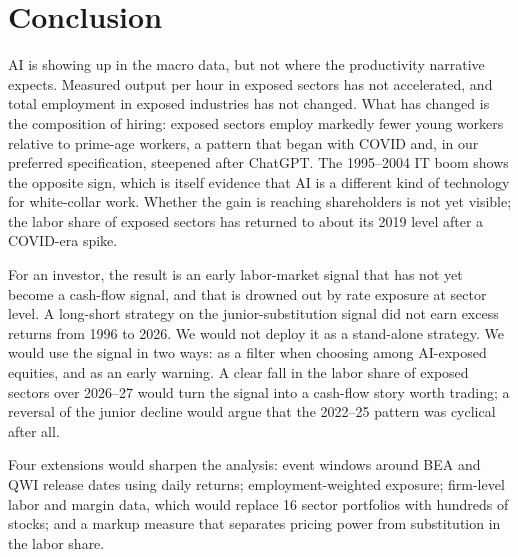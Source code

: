 \section{Conclusion}
\label{sec:conclusion}

AI is showing up in the macro data, but not where the productivity narrative expects. Measured output per hour in exposed sectors has not accelerated, and total employment in exposed industries has not changed. What has changed is the composition of hiring: exposed sectors employ markedly fewer young workers relative to prime-age workers, a pattern that began with COVID and, in our preferred specification, steepened after ChatGPT. The 1995--2004 IT boom shows the opposite sign, which is itself evidence that AI is a different kind of technology for white-collar work. Whether the gain is reaching shareholders is not yet visible; the labor share of exposed sectors has returned to about its 2019 level after a COVID-era spike.

For an investor, the result is an early labor-market signal that has not yet become a cash-flow signal, and that is drowned out by rate exposure at sector level. A long-short strategy on the junior-substitution signal did not earn excess returns from 1996 to 2026. We would not deploy it as a stand-alone strategy. We would use the signal in two ways: as a filter when choosing among AI-exposed equities, and as an early warning. A clear fall in the labor share of exposed sectors over 2026--27 would turn the signal into a cash-flow story worth trading; a reversal of the junior decline would argue that the 2022--25 pattern was cyclical after all.

Four extensions would sharpen the analysis: event windows around BEA and QWI release dates using daily returns; employment-weighted exposure; firm-level labor and margin data, which would replace 16 sector portfolios with hundreds of stocks; and a markup measure that separates pricing power from substitution in the labor share.
